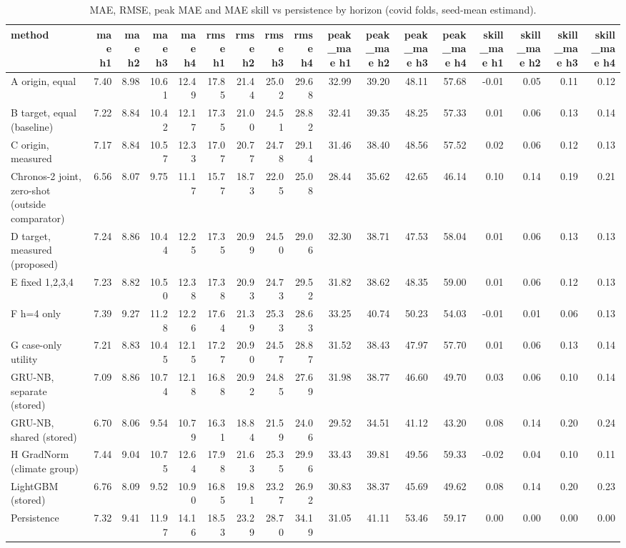 \begin{table}[t]
\centering
\small
\caption{MAE, RMSE, peak MAE and MAE skill vs persistence by horizon (covid folds, seed-mean estimand).}
\label{tab:metrics-covid-seed-mean}
\begin{tabular}{lrrrrrrrrrrrrrrrr}
\toprule
method & mae h1 & mae h2 & mae h3 & mae h4 & rmse h1 & rmse h2 & rmse h3 & rmse h4 & peak\_mae h1 & peak\_mae h2 & peak\_mae h3 & peak\_mae h4 & skill\_mae h1 & skill\_mae h2 & skill\_mae h3 & skill\_mae h4 \\
\midrule
A origin, equal & 7.40 & 8.98 & 10.61 & 12.49 & 17.85 & 21.44 & 25.02 & 29.68 & 32.99 & 39.20 & 48.11 & 57.68 & -0.01 & 0.05 & 0.11 & 0.12 \\
B target, equal (baseline) & 7.22 & 8.84 & 10.42 & 12.17 & 17.35 & 21.00 & 24.51 & 28.82 & 32.41 & 39.35 & 48.25 & 57.33 & 0.01 & 0.06 & 0.13 & 0.14 \\
C origin, measured & 7.17 & 8.84 & 10.57 & 12.33 & 17.07 & 20.77 & 24.78 & 29.14 & 31.46 & 38.40 & 48.56 & 57.52 & 0.02 & 0.06 & 0.12 & 0.13 \\
Chronos-2 joint, zero-shot (outside comparator) & 6.56 & 8.07 & 9.75 & 11.17 & 15.77 & 18.73 & 22.05 & 25.08 & 28.44 & 35.62 & 42.65 & 46.14 & 0.10 & 0.14 & 0.19 & 0.21 \\
D target, measured (proposed) & 7.24 & 8.86 & 10.44 & 12.25 & 17.35 & 20.99 & 24.50 & 29.06 & 32.30 & 38.71 & 47.53 & 58.04 & 0.01 & 0.06 & 0.13 & 0.13 \\
E fixed 1,2,3,4 & 7.23 & 8.82 & 10.50 & 12.38 & 17.38 & 20.93 & 24.73 & 29.52 & 31.82 & 38.62 & 48.35 & 59.00 & 0.01 & 0.06 & 0.12 & 0.13 \\
F h=4 only & 7.39 & 9.27 & 11.28 & 12.26 & 17.64 & 21.39 & 25.33 & 28.63 & 33.25 & 40.74 & 50.23 & 54.03 & -0.01 & 0.01 & 0.06 & 0.13 \\
G case-only utility & 7.21 & 8.83 & 10.45 & 12.15 & 17.27 & 20.90 & 24.57 & 28.87 & 31.52 & 38.43 & 47.97 & 57.70 & 0.01 & 0.06 & 0.13 & 0.14 \\
GRU-NB, separate (stored) & 7.09 & 8.86 & 10.74 & 12.18 & 16.88 & 20.92 & 24.85 & 27.69 & 31.98 & 38.77 & 46.60 & 49.70 & 0.03 & 0.06 & 0.10 & 0.14 \\
GRU-NB, shared (stored) & 6.70 & 8.06 & 9.54 & 10.79 & 16.31 & 18.84 & 21.59 & 24.06 & 29.52 & 34.51 & 41.12 & 43.20 & 0.08 & 0.14 & 0.20 & 0.24 \\
H GradNorm (climate group) & 7.44 & 9.04 & 10.75 & 12.64 & 17.98 & 21.63 & 25.35 & 29.96 & 33.43 & 39.81 & 49.56 & 59.33 & -0.02 & 0.04 & 0.10 & 0.11 \\
LightGBM (stored) & 6.76 & 8.09 & 9.52 & 10.90 & 16.85 & 19.81 & 23.27 & 26.92 & 30.83 & 38.37 & 45.69 & 49.62 & 0.08 & 0.14 & 0.20 & 0.23 \\
Persistence & 7.32 & 9.41 & 11.97 & 14.16 & 18.53 & 23.29 & 28.70 & 34.19 & 31.05 & 41.11 & 53.46 & 59.17 & 0.00 & 0.00 & 0.00 & 0.00 \\
\bottomrule
\end{tabular}
\end{table}
